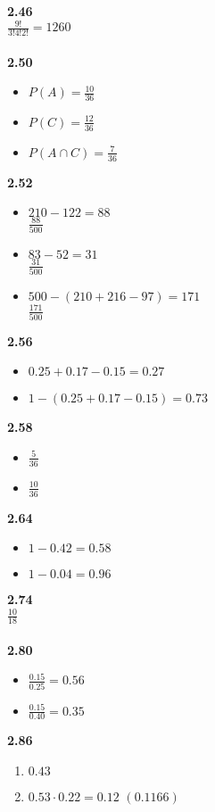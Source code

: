 \documentclass{article}
\begin{document}
    \textbf{2.46}\\
        $\frac{9!}{3!4!2!} = 1260$\\\\
    \textbf{2.50}
        \begin{itemize}
            \item $P(A) = \frac{10}{36}$
            \item $P(C) = \frac{12}{36}$
            \item $P(A\cap C) = \frac{7}{36}$
        \end{itemize}
    \textbf{2.52}
        \begin{itemize}
            \item $210 - 122 = 88$\\
                $\frac{88}{500}$
            \item $83 - 52 = 31$\\
                $\frac{31}{500}$
            \item $500 - (210 + 216 - 97) = 171$\\
                $\frac{171}{500}$
        \end{itemize}
    \textbf{2.56}
        \begin{itemize}
            \item $0.25 + 0.17 - 0.15 = 0.27$
            \item $1 - (0.25 + 0.17 - 0.15) = 0.73$
        \end{itemize}
    \textbf{2.58}
        \begin{itemize}
            \item $\frac{5}{36}$
            \item $\frac{10}{36}$
        \end{itemize}
    \textbf{2.64}
        \begin{itemize}
            \item $1 - 0.42 = 0.58$
            \item $1 - 0.04 = 0.96$
        \end{itemize}
    \textbf{2.74}\\
        $\frac{10}{18}$\\\\
    \textbf{2.80}
        \begin{itemize}
            \item $\frac{0.15}{0.25} = 0.56$
            \item $\frac{0.15}{0.40} = 0.35$
        \end{itemize}
    \textbf{2.86}
        \begin{enumerate}
            \item $0.43$
            \item $0.53 \cdot 0.22 = 0.12$ $ (0.1166)$
        \end{enumerate}
\end{document}

